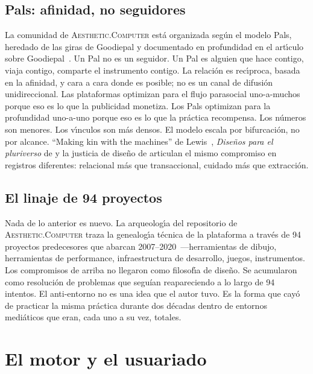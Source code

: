 \documentclass[10pt,letterpaper,twocolumn]{article}
\newcommand{\ac}{\textsc{Aesthetic.Computer}}
\begin{document}
\subsection{Pals: afinidad, no seguidores}

La comunidad de \ac{} est\'{a} organizada seg\'{u}n el modelo Pals, heredado de las giras de Goodiepal y documentado en profundidad en el art\'{\i}culo sobre Goodiepal~\citep{scudder2026goodiepal}. Un Pal no es un seguidor. Un Pal es alguien que hace contigo, viaja contigo, comparte el instrumento contigo. La relaci\'{o}n es rec\'{\i}proca, basada en la afinidad, y cara a cara donde es posible; no es un canal de difusi\'{o}n unidireccional. Las plataformas optimizan para el flujo parasocial uno-a-muchos porque eso es lo que la publicidad monetiza. Los Pals optimizan para la profundidad uno-a-uno porque eso es lo que la pr\'{a}ctica recompensa. Los n\'{u}meros son menores. Los v\'{\i}nculos son m\'{a}s densos. El modelo escala por bifurcaci\'{o}n, no por alcance. ``Making kin with the machines'' de Lewis~\citep{lewis2018making}, \emph{Dise\~{n}os para el pluriverso} de \citet{escobar2018designs} y la justicia de dise\~{n}o de \citet{costanzachock2020design} articulan el mismo compromiso en registros diferentes: relacional m\'{a}s que transaccional, cuidado m\'{a}s que extracci\'{o}n.

\subsection{El linaje de 94 proyectos}

Nada de lo anterior es nuevo. La arqueolog\'{\i}a del repositorio de \ac{} traza la genealog\'{\i}a t\'{e}cnica de la plataforma a trav\'{e}s de 94 proyectos predecesores que abarcan 2007--2020~\citep{scudder2026archaeology}---herramientas de dibujo, herramientas de performance, infraestructura de desarrollo, juegos, instrumentos. Los compromisos de arriba no llegaron como filosof\'{\i}a de dise\~{n}o. Se acumularon como resoluci\'{o}n de problemas que seguían reapareciendo a lo largo de 94 intentos. El anti-entorno no es una idea que el autor tuvo. Es la forma que cay\'{o} de practicar la misma pr\'{a}ctica durante dos d\'{e}cadas dentro de entornos medi\'{a}ticos que eran, cada uno a su vez, totales.

\section{El motor y el usuariado}
\end{document}
